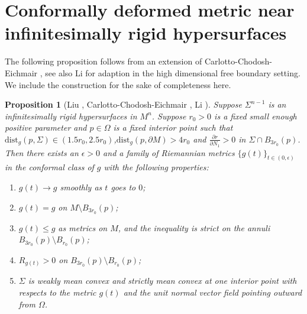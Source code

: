 \documentclass[11pt,letterpaper]{amsart}
\newtheorem{prop}{Proposition}[section]
\begin{document}
\appendix \section{Conformally deformed metric near infinitesimally rigid hypersurfaces} \label{appendixconf}
The following proposition follows from an extension of Carlotto-Chodosh-Eichmair \cite{carlotto2016effective}, see also Li \cite{li2024dihedral} for adaption in the high dimensional free boundary setting. We include the construction for the sake of completeness here.

\begin{prop}[Liu \cite{liu20133}, Carlotto-Chodosh-Eichmair \cite{carlotto2016effective}, Li \cite{li2024dihedral}] \label{prop : deformedmetric}
    Suppose $\Sigma^{n-1}$ is an infinitesimally rigid hypersurfaces in $M^{n}$. Suppose $r_0>0$ is a fixed small enough positive parameter and $p\in \Omega$ is a fixed interior point such that $\text{dist}_g(p,\Sigma)\in (1.5r_0,2.5r_0)$,$\text{dist}_g(p,\partial M)>4r_0$ and $\frac{\partial r}{\partial N_1}>0$ in $\Sigma\cap B_{3r_0}(p)$.  Then there exists an $\epsilon>0$ and a family of Riemannian metrics $\{g(t)\}_{t\in(0,\epsilon)}$ in the conformal class of $g$ with the following properties:
    \begin{enumerate}
        \item $g(t)\to g$ smoothly as $t$ goes to $0$;
        \item $g(t)=g$ on $M\setminus B_{3r_0}(p)$;
        \item $g(t)\leq g$ as metrics on $M$, and the inequality is strict on the annuli $B_{3r_0}(p)\setminus B_{r_0}(p)$;
        \item $R_{g(t)}>0$ on $B_{3r_0}(p)\setminus B_{r_0}(p)$;
        \item $\Sigma$ is weakly mean convex and strictly mean convex at one interior point with respects to the metric $g(t)$ and the unit normal vector field pointing outward from $\Omega$.
    \end{enumerate}
\end{prop}
\end{document}
